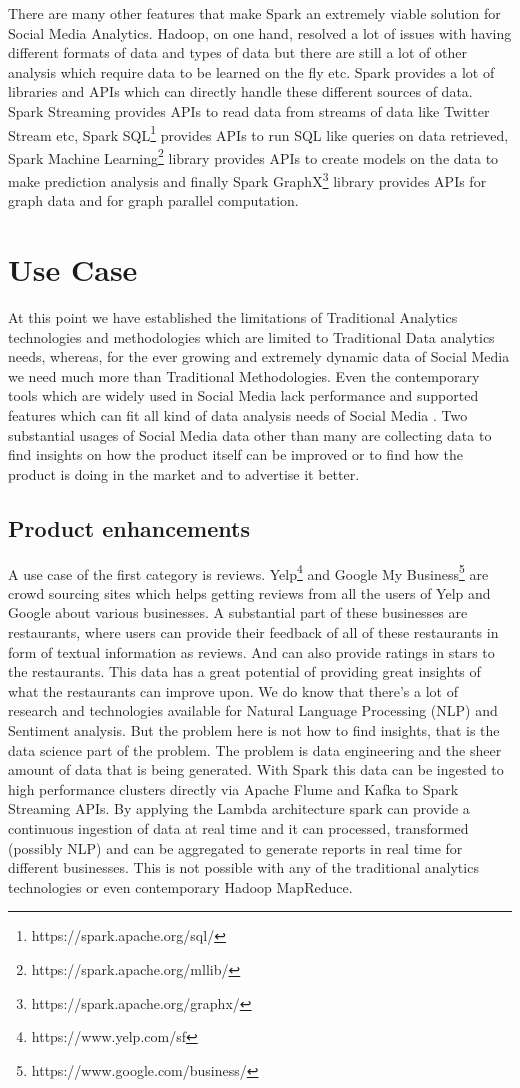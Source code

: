 \documentclass[sigconf]{acmart}
\begin{document}
There are many other features that make Spark an extremely viable solution for Social Media Analytics. Hadoop, on one hand, resolved a lot of issues with having different formats of data and types of data but there are still a lot of other analysis which require data to be learned on the fly etc. Spark provides a lot of libraries and APIs which can directly handle these different sources of data. Spark Streaming provides APIs to read data from streams of data like Twitter Stream etc, Spark SQL\footnote{https://spark.apache.org/sql/} provides APIs to run SQL like queries on data retrieved, Spark Machine Learning\footnote{https://spark.apache.org/mllib/} library provides APIs to create models on the data to make prediction analysis and finally Spark GraphX\footnote{https://spark.apache.org/graphx/} library provides APIs for graph data and for graph parallel computation.
\section{Use Case}
At this point we have established the limitations of Traditional Analytics technologies and methodologies which are limited to Traditional Data analytics needs, whereas, for the ever growing and extremely dynamic data of Social Media we need much more than Traditional Methodologies. Even the contemporary tools which are widely used in Social Media lack performance and supported features which can fit all kind of data analysis needs of Social Media  \cite{krishnan}. Two substantial usages of Social Media data other than many are collecting data to find insights on how the product itself can be improved or to find how the product is doing in the market and to advertise it better.
\subsection{Product enhancements}
A use case of the first category is reviews. Yelp\footnote{https://www.yelp.com/sf} and Google My Business\footnote{https://www.google.com/business/} are crowd sourcing sites which helps getting reviews from all the users of Yelp and Google about various businesses. A substantial part of these businesses are restaurants, where users can provide their feedback of all of these restaurants in form of textual information as reviews. And can also provide ratings in stars to the restaurants. This data has a great potential of providing great insights of what the restaurants can improve upon. We do know that there's a lot of research and technologies available for Natural Language Processing (NLP) and Sentiment analysis. But the problem here is not how to find insights, that is the data science part of the problem. The problem is data engineering and the sheer amount of data that is being generated. With Spark this data can be ingested to high performance clusters directly via Apache Flume and Kafka to Spark Streaming APIs. By applying the Lambda architecture  \cite{lambdaspark} spark can provide a continuous ingestion of data at real time and it can processed, transformed (possibly NLP) and can be aggregated to generate reports in real time for different businesses. This is not possible with any of the traditional analytics technologies or even contemporary Hadoop MapReduce.
\end{document}
